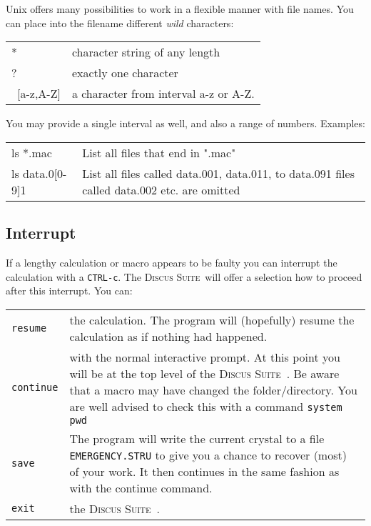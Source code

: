 \documentclass[11pt]{report}
\newcommand{\Suite}{\textsc{Discus Suite\ }}
\begin{document}
{Unix offers many possibilities to work in a flexible manner with file 
names. You can place into the filename different {\it wild} characters:

\begin{tabularx}{\textwidth}{p{25mm}X}
* & character string of any length\\
? & exactly one character\\
\ [a-z,A-Z] & a character from interval a-z or A-Z.\\
\end{tabularx}

You may provide a single interval as well, and also a range of numbers.
Examples:

\begin{tabularx}{\textwidth}{p{25mm}X}
ls *.mac & List all files that end in ".mac"\\
ls data.0[0-9]1 & List all files called data.001, data.011, to data.091
files called data.002 etc. are omitted\\
\end{tabularx}


\subsection{Interrupt} \label{over-inter}
If a lengthy calculation or macro appears to be faulty you can interrupt
the calculation with a {\tt CTRL-c}. The \Suite will offer a selection
how to proceed after this interrupt. You can:


\begin{tabularx}{\textwidth}{p{25mm}X}
{\tt resume} & the calculation. The program will (hopefully) resume
   the calculation as if nothing had happened. \\
{\tt continue} & with the normal interactive prompt. At this point
   you will be at the top level of the \Suite. Be aware that a macro
   may have changed the folder/directory. You are well advised to 
   check this with a command {\tt system pwd} \\
{\tt save} & The program will write the current crystal 
   to a file {\tt EMERGENCY.STRU} to give you a chance to recover 
   (most) of your work. It then continues in the same fashion as with the
   continue command. \\
{\tt exit} & the \Suite. \\
\end{tabularx}
%
%

}
\end{document}
